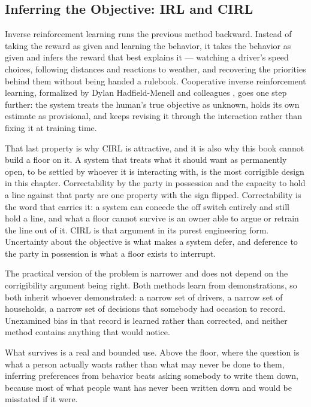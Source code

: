 \subsection{Inferring the Objective: IRL and CIRL}
\label{sec:4.2.3}
Inverse reinforcement learning runs the previous method backward. Instead of taking the reward as given and learning the behavior, it takes the behavior as given and infers the reward that best explains it — watching a driver's speed choices, following distances and reactions to weather, and recovering the priorities behind them without being handed a rulebook. Cooperative inverse reinforcement learning, formalized by Dylan Hadfield-Menell and colleagues \autocite{hadfieldmenell2016cooperative}, goes one step further: the system treats the human's true objective as unknown, holds its own estimate as provisional, and keeps revising it through the interaction rather than fixing it at training time.

That last property is why CIRL is attractive, and it is also why this book cannot build a floor on it. A system that treats what it should want as permanently open, to be settled by whoever it is interacting with, is the most corrigible design in this chapter. Correctability by the party in possession and the capacity to hold a line against that party are one property with the sign flipped. Correctability is the word that carries it: a system can concede the off switch entirely and still hold a line, and what a floor cannot survive is an owner able to argue or retrain the line out of it. CIRL is that argument in its purest engineering form. Uncertainty about the objective is what makes a system defer, and deference to the party in possession is what a floor exists to interrupt.

The practical version of the problem is narrower and does not depend on the corrigibility argument being right. Both methods learn from demonstrations, so both inherit whoever demonstrated: a narrow set of drivers, a narrow set of households, a narrow set of decisions that somebody had occasion to record. Unexamined bias in that record is learned rather than corrected, and neither method contains anything that would notice.

What survives is a real and bounded use. Above the floor, where the question is what a person actually wants rather than what may never be done to them, inferring preferences from behavior beats asking somebody to write them down, because most of what people want has never been written down and would be misstated if it were.
